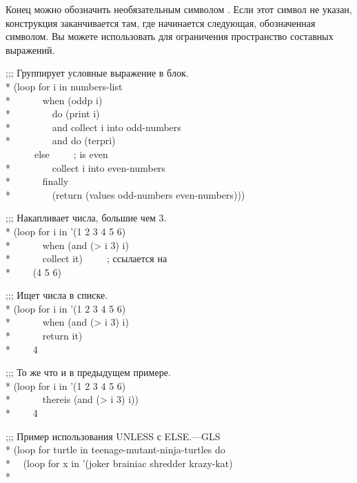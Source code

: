 \begin{defloop}
Конец можно обозначить необязательным символом . Если этот
символ не указан, конструкция заканчивается там, где начинается
следующая, обозначенная символом. Вы можете использовать  для
ограничения пространство составных выражений.
\begin{lisp}
;;; Группирует условные выражение в блок. \\*
(loop for i in numbers-list \\*
~~~~~~when (oddp i) \\*
~~~~~~~~do (print i) \\*
~~~~~~~~and collect i into odd-numbers \\*
~~~~~~~~and do (terpri) \\
~~~~~~else~~~~~;\textrm{ is even} \\*
~~~~~~~~collect i into even-numbers \\*
~~~~~~finally \\*
~~~~~~~~(return (values odd-numbers even-numbers)))
\end{lisp}
\begin{lisp}
;;; Накапливает числа, большие чем 3. \\*
(loop for i in '(1 2 3 4 5 6) \\*
~~~~~~when (and (> i 3) i) \\*
~~~~~~collect it)~~~~~;\textrm{ ссылается на } \\*
~~~\EV~(4 5 6)
\end{lisp}
\begin{lisp}
;;; Ищет числа в списке. \\*
(loop for i in '(1 2 3 4 5 6) \\*
~~~~~~when (and (> i 3) i) \\*
~~~~~~return it) \\*
~~~\EV~4
\end{lisp}
\begin{lisp}
;;; То же что и в предыдущем примере. \\*
(loop for i in '(1 2 3 4 5 6) \\*
~~~~~~thereis (and (> i 3) i)) \\*
~~~\EV~4
\end{lisp}
\begin{lisp}
;;; Пример использования UNLESS с ELSE.\`\textrm{---GLS} \\*
(loop for turtle in teenage-mutant-ninja-turtles do\\*
~~(loop for x in '(joker brainiac shredder krazy-kat) \\*

\end{lisp}
\end{defloop}
